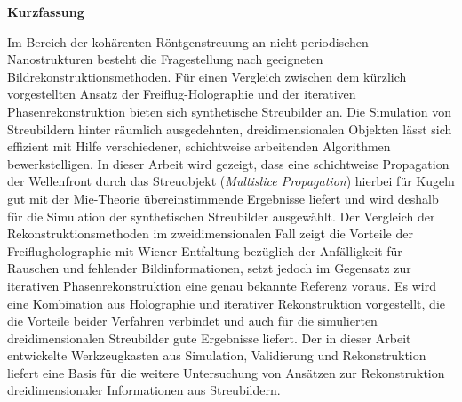 	\begin{Huge}
		\textbf{Kurzfassung}\vspace{12mm}
	\end{Huge}
	
	Im Bereich der kohärenten Röntgenstreuung an nicht-periodischen Nanostrukturen besteht die Fragestellung nach geeigneten Bildrekonstruktionsmethoden. Für einen Vergleich zwischen dem kürzlich vorgestellten Ansatz der Freiflug-Holographie und der iterativen Phasenrekonstruktion bieten sich synthetische Streubilder an. Die Simulation von Streubildern hinter räumlich ausgedehnten, dreidimensionalen Objekten lässt sich effizient mit Hilfe verschiedener, schichtweise arbeitenden Algorithmen bewerkstelligen. In dieser Arbeit wird gezeigt, dass eine schichtweise Propagation der Wellenfront durch das Streuobjekt (\textit{Multislice Propagation}) hierbei für Kugeln gut mit der Mie-Theorie übereinstimmende Ergebnisse liefert und wird deshalb für die Simulation der synthetischen Streubilder ausgewählt. Der Vergleich der Rekonstruktionsmethoden im zweidimensionalen Fall zeigt die Vorteile der Freiflugholographie mit Wiener-Entfaltung bezüglich der Anfälligkeit für Rauschen und fehlender Bildinformationen, setzt jedoch im Gegensatz zur iterativen Phasenrekonstruktion eine genau bekannte Referenz voraus. Es wird eine Kombination aus Holographie und iterativer Rekonstruktion vorgestellt, die die Vorteile beider Verfahren verbindet und auch für die simulierten dreidimensionalen Streubilder gute Ergebnisse liefert. Der in dieser Arbeit entwickelte Werkzeugkasten aus Simulation, Validierung und Rekonstruktion liefert eine Basis für die weitere Untersuchung von Ansätzen zur Rekonstruktion dreidimensionaler Informationen aus Streubildern.
